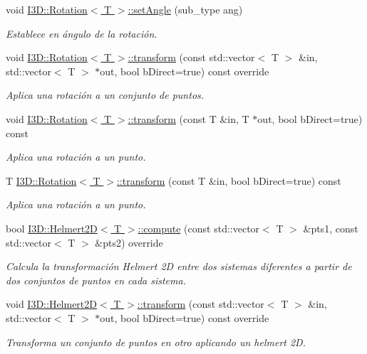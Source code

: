 \begin{DoxyCompactItemize}
void \hyperlink{group__trf2_d_group_gacc531b7f0f00dd34f197a5c9ba07b8e2}{I3\+D\+::\+Rotation$<$ T $>$\+::set\+Angle} (sub\+\_\+type ang)
\begin{DoxyCompactList}\small\item\em Establece en ángulo de la rotación. \end{DoxyCompactList}\item 
void \hyperlink{group__trf2_d_group_ga0032788395928aa7419d506981ef03d3}{I3\+D\+::\+Rotation$<$ T $>$\+::transform} (const std\+::vector$<$ T $>$ \&in, std\+::vector$<$ T $>$ $\ast$out, bool b\+Direct=true) const  override
\begin{DoxyCompactList}\small\item\em Aplica una rotación a un conjunto de puntos. \end{DoxyCompactList}\item 
void \hyperlink{group__trf2_d_group_ga40ad8baf1f908752fe8afe20b71e8d67}{I3\+D\+::\+Rotation$<$ T $>$\+::transform} (const T \&in, T $\ast$out, bool b\+Direct=true) const 
\begin{DoxyCompactList}\small\item\em Aplica una rotación a un punto. \end{DoxyCompactList}\item 
T \hyperlink{group__trf2_d_group_ga7db02aea0ee3a8c5167e16de0c89b079}{I3\+D\+::\+Rotation$<$ T $>$\+::transform} (const T \&in, bool b\+Direct=true) const 
\begin{DoxyCompactList}\small\item\em Aplica una rotación a un punto. \end{DoxyCompactList}\item 
bool \hyperlink{group__trf2_d_group_ga300279dee0a002835c25322bd2ea9398}{I3\+D\+::\+Helmert2\+D$<$ T $>$\+::compute} (const std\+::vector$<$ T $>$ \&pts1, const std\+::vector$<$ T $>$ \&pts2) override
\begin{DoxyCompactList}\small\item\em Calcula la transformación Helmert 2D entre dos sistemas diferentes a partir de dos conjuntos de puntos en cada sistema. \end{DoxyCompactList}\item 
void \hyperlink{group__trf2_d_group_gab7354b67b291bf01b3fd045578598fb1}{I3\+D\+::\+Helmert2\+D$<$ T $>$\+::transform} (const std\+::vector$<$ T $>$ \&in, std\+::vector$<$ T $>$ $\ast$out, bool b\+Direct=true) const  override
\begin{DoxyCompactList}\small\item\em Transforma un conjunto de puntos en otro aplicando un helmert 2D. \end{DoxyCompactList}\item 

\end{DoxyCompactItemize}
